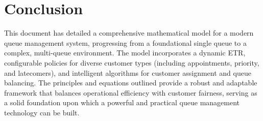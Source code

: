 \documentclass{article}
\begin{document}
\section{Conclusion}
This document has detailed a comprehensive mathematical model for a modern queue management system, progressing from a foundational single queue to a complex, multi-queue environment. The model incorporates a dynamic ETR, configurable policies for diverse customer types (including appointments, priority, and latecomers), and intelligent algorithms for customer assignment and queue balancing. The principles and equations outlined provide a robust and adaptable framework that balances operational efficiency with customer fairness, serving as a solid foundation upon which a powerful and practical queue management technology can be built.
\end{document}
